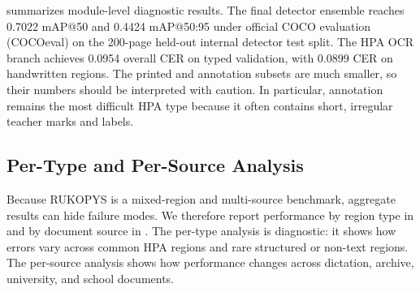 \documentclass[runningheads]{llncs}
\begin{document}
 summarizes module-level diagnostic results. The final detector ensemble reaches 0.7022 mAP@50 and 0.4424 mAP@50:95 under official COCO evaluation (COCOeval) on the 200-page held-out internal detector test split. The HPA OCR branch achieves 0.0954 overall CER on typed validation, with 0.0899 CER on handwritten regions. The printed and annotation subsets are much smaller, so their numbers should be interpreted with caution. In particular, annotation remains the most difficult HPA type because it often contains short, irregular teacher marks and labels.



\subsection{Per-Type and Per-Source Analysis}
\label{sec:per-type-source}

Because RUKOPYS is a mixed-region and multi-source benchmark, aggregate results can hide failure modes. We therefore report performance by region type in  and by document source in . The per-type analysis is diagnostic: it shows how errors vary across common HPA regions and rare structured or non-text regions. The per-source analysis shows how performance changes across dictation, archive, university, and school documents.
\end{document}
